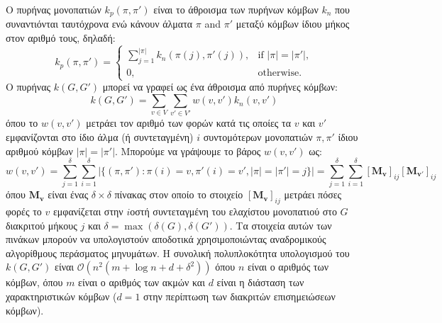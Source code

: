 Ο πυρήνας μονοπατιών $k_p(\pi, \pi')$ είναι το άθροισμα των πυρήνων κόμβων $k_n$ που συναντιόνται ταυτόχρονα ενώ κάνουν άλματα $\pi$ and $\pi'$ μεταξύ κόμβων ίδιου μήκος στον αριθμό τους, δηλαδή:
\begin{equation}
    k_p(\pi, \pi') = \begin{cases}
        \sum_{j=1}^{|\pi|} k_n(\pi(j), \pi'(j)), & \text{if $|\pi| = |\pi'|$},\\
        0, & \text{otherwise.} 
        \end{cases}
\end{equation}
Ο πυρήνας $k(G,G')$ μπορεί να γραφεί ως ένα άθροισμα από πυρήνες κόμβων:
\begin{equation}
    k(G,G') = \sum_{v \in V} \sum_{v' \in V'} w(v,v') k_n(v, v')
\end{equation}
όπου το $w(v,v')$ μετράει τον αριθμό των φορών κατά τις οποίες τα $v$ και $v'$ εμφανίζονται στο ίδιο άλμα (ή συντεταγμένη) $i$ συντομότερων μονοπατιών $\pi,\pi'$ ίδιου αριθμού κόμβων $|\pi| = |\pi'|$.
Μπορούμε να γράψουμε το βάρος $w(v,v')$ ως:
\begin{equation}
    w(v,v') = \sum_{j=1}^\delta \sum_{i=1}^\delta | \{ (\pi,\pi') : \pi(i)=v, \pi'(i)=v', |\pi|=|\pi'|=j \} | = \sum_{j=1}^\delta \sum_{i=1}^\delta [\mathbf{M_v}]_{ij} [\mathbf{M_{v'}}]_{ij}
\end{equation}
όπου $\mathbf{M_v}$ είναι ένας $\delta \times \delta$ πίνακας στον οποίο το στοιχείο $[\mathbf{M_v}]_{ij}$ μετράει πόσες φορές το $v$ εμφανίζεται στην $i$οστή συντεταγμένη του ελαχίστου μονοπατιού στο $G$ διακριτού μήκους $j$ και $\delta = \max(\delta(G), \delta(G'))$.
Τα στοιχεία αυτών των πινάκων μπορούν να υπολογιστούν αποδοτικά χρησιμοποιώντας αναδρομικούς αλγορίθμους περάσματος μηνυμάτων. 
Η συνολική πολυπλοκότητα υπολογισμού του $k(G,G')$ είναι $\mathcal{O}(n^2(m + \log n + d + \delta^2))$ όπου $n$ είναι ο αριθμός των κόμβων, όπου $m$ είναι ο αριθμός των ακμών και $d$ είναι η διάσταση των χαρακτηριστικών κόμβων ($d=1$ στην περίπτωση των διακριτών επισημειώσεων κόμβων).

